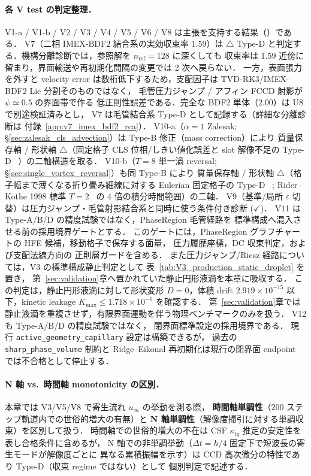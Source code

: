 \paragraph{各 V test の判定整理．}
V1-a / V1-b / V2 / V3 / V4 / V5 / V6 / V8 は主張を支持する結果（\checkmark）である．
V7（二相 IMEX-BDF2 結合系の実効収束率 $1.59$）は
$\triangle$ Type-D と判定する．機構分離診断では，参照解を $n_{\mathrm{ref}}=128$ に深くしても
収束率は $1.59$ 近傍に留まり，界面輸送や再初期化間隔の変更では 2 次へ戻らない．
一方，表面張力を外すと velocity error は数桁低下するため，支配因子は
TVD-RK3/IMEX-BDF2 Lie 分割そのものではなく，
毛管圧力ジャンプ / アフィン FCCD 射影が $\psi\simeq0.5$ の界面帯で作る
低正則性誤差である．完全な BDF2 単体（$2.00$）は U8 で別途検証済みとし，
V7 は毛管結合系 Type-D として記録する（詳細な分離診断は
付録~\ref{app:v7_imex_bdf2_rca}）．
V10-a（$\alpha=1$ Zalesak; §\ref{sec:zalesak_cls_advection}）は Type-B 修正（mass correction）により
質量保存軸 \checkmark / 形状軸 $\triangle$（固定格子 CLS 位相/しきい値化誤差と slot 解像不足の Type-D
~\cite{Zalesak1979,OlssonKreiss2005}）の二軸構造を取る．
V10-b（$T=8$ 単一渦 reversal; §\ref{sec:single_vortex_reversal}）も同 Type-B により
質量保存軸 \checkmark / 形状軸 $\triangle$（格子幅まで薄くなる折り畳み細線に対する Eulerian 固定格子の Type-D
~\cite{EnrightFedkiwFerzigerMitchell2002}; Rider--Kothe 1998 標準
$T=2$~\cite{LeVeque1996,RiderKothe1998} の 4 倍の積分時間範囲）の二軸．
V9（基準/局所 $\varepsilon$ 切替）は圧力ジャンプ・毛管射影結合系と同時に使う条件付き診断 ($\checkmark$)．
V11 は Type-A/B/D の精度試験ではなく，PhaseRegion 毛管経路を
標準構成へ混入させる前の採用境界ゲートとする．
このゲートには，PhaseRegion グラフチャートの HFE 候補，移動格子で保存する面量，
圧力履歴座標，DC 収束判定，および支配法線方向の
正則層ガードを含める．
また圧力ジャンプ/Riesz 経路については，V3 の標準構成静止判定として
表~\ref{tab:V3_production_static_droplet} を置き，
第~\ref{sec:validation}章へ置かれていた静止円形液滴を本章に吸収する．
この判定は，静止円形液滴に対して形状変形 $D=0$，体積 drift
$2.919\times10^{-15}$ 以下，kinetic leakage $K_{\max}\le1.718\times10^{-6}$ を確認する．
第~\ref{sec:validation}章では静止液滴を重複させず，有限界面運動を伴う物理ベンチマークのみを扱う．
V12 も Type-A/B/D の精度試験ではなく，
閉界面標準設定の採用境界である．
現行 \texttt{active\_geometry\_capillary} 設定は構築できるが，
過去の \texttt{sharp\_phase\_volume} 制約と
Ridge--Eikonal 再初期化は現行の閉界面 endpoint では不合格として停止する．

\paragraph{N 軸 vs.\ 時間軸 monotonicity の区別．}
本章では V3/V5/V8 で寄生流れ $u_\infty$ の挙動を測る際，
\textbf{時間軸単調性}（200 ステップ軌道内での世俗的増大の有無）と
\textbf{N 軸単調性}（解像度掃引に対する単調収束）を区別して扱う．
時間軸での世俗的増大の不在は CSF $\kappa_{lg}$ 推定の安定性を表し合格条件に含めるが，
N 軸での非単調挙動（$\Delta t = h/4$ 固定下で短波長の寄生モードが解像度ごとに
異なる累積振幅を示す）は CCD 高次微分の特性であり Type-D（収束 regime ではない）として
個別判定で記述する．


